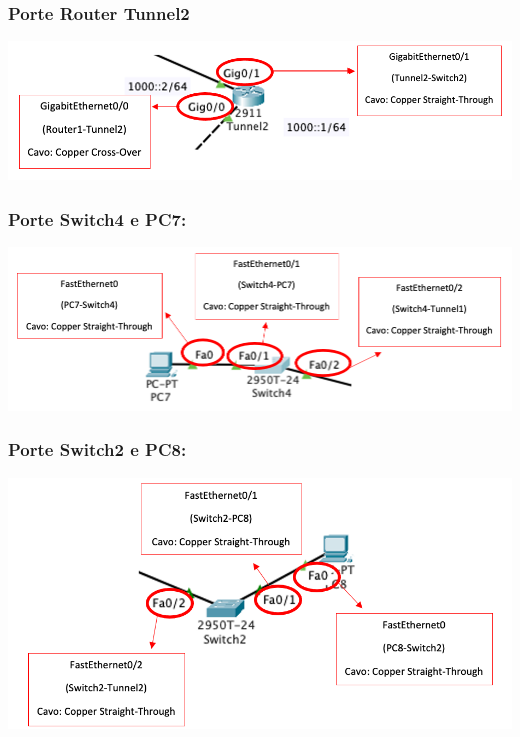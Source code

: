 \subsubsection*{Porte Router Tunnel2}

\begin{center}
    \includegraphics[width=\linewidth]{images/07.routing-sicurezza/tunneling/07.png}
\end{center}

\subsubsection*{Porte Switch4 e PC7:}

\begin{center}
    \includegraphics[width=\linewidth]{images/07.routing-sicurezza/tunneling/08.png}
\end{center}

\subsubsection*{Porte Switch2 e PC8:}

\begin{center}
    \includegraphics[width=\linewidth]{images/07.routing-sicurezza/tunneling/09.png}
\end{center}

